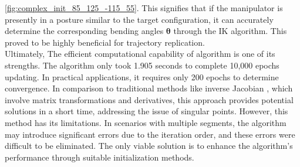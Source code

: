 \ref{fig:complex_init_85_125_-115_55}. This signifies that if the manipulator is presently in a posture similar 
to the target configuration, it can accurately determine the corresponding bending angles $\boldsymbol{\theta}$ through the 
IK algorithm. This proved to be highly beneficial for trajectory replication. \\
Ultimately, The efficient computational capability of algorithm is one of its strengths. The algorithm only 
took 1.905 seconds to complete 10,000 epochs updating. In practical applications, it requires only 200 epochs 
to determine convergence. In comparison to traditional methods like inverse Jacobian \cite{inverse_jacobian}, 
which involve matrix transformations and derivatives, this approach provides potential solutions in a short 
time, addressing the issue of singular points. However, this method has its limitations. In scenarios with 
multiple segments, the algorithm may introduce significant errors due to the iteration order, and these errors 
were difficult to be eliminated. The only viable solution is to enhance the algorithm's performance through 
suitable initialization methods.
